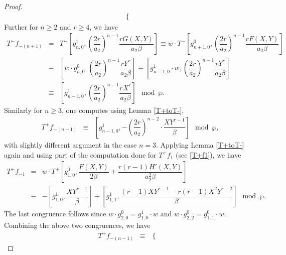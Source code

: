 \documentclass[11pt, reqno]{amsart}
\numberwithin{equation}{section}
\theoremstyle{definition}
\theoremstyle{remark}
\theoremstyle{definition}
\theoremstyle{remark}
\theoremstyle{remark}
\begin{document}
\begin{proof}
\begin{eqnarray}
\begin{cases}
\end{cases}
\end{eqnarray} 
Further for $n\geq 2$ and $r\geq 4$, we have
\begin{eqnarray*}\label{congT^-}
    T^-f_{-(n+1)}& =& T^-\left[g_{n,0}^{1}, \left(\dfrac{2r}{a_2}\right)^{n-1}\dfrac{rG(X,Y)}{a_{2}\beta}\right]
    \equiv w\cdot T^-\left[g_{n+1,0}^{0}, \left(\dfrac{2r}{a_2}\right)^{n-1}\dfrac{rF(X,Y)}{a_{2}\beta}\right]\nonumber\\
    &\equiv&  \left[w \cdot g_{n,0}^{0}, \left(\dfrac{2r}{a_2}\right)^{n-1}\dfrac{rY^{r}}{a_{2}\beta}\right]
    \equiv \left[g_{n-1,0}^{1} \cdot w, \left(\dfrac{2r}{a_2}\right)^{n-1}\dfrac{rY^{r}}{a_{2}\beta}\right]\nonumber\\
      &\equiv&  \left[g_{n-1,0}^{1}, \left(\dfrac{2r}{a_2}\right)^{n-1}\dfrac{rX^{r}}{a_{2}\beta}\right]\mod\wp.
\end{eqnarray*}
Similarly for $n\geq 3$, one computes using Lemma \ref{T+toT-},
\begin{eqnarray}\label{congT^+}
     T^+f_{-(n-1)} &\equiv &\left[g_{n-1,0}^1, -\left(\dfrac{2r}{a_2}\right)^{n-2}\cdot\dfrac{XY^{r-1}}{\beta}\right]\mod\wp,
\end{eqnarray}
with slightly different argument in the case $n=3$. Applying Lemma \ref{T+toT-} again and using part of the computation done for $T^+f_1$ (see \eqref{T+f1}), we have
\begin{eqnarray*}\label{T+f-1}
    T^{+}f_{-1} %
   &=& w\cdot T^{+}\left[g_{1,0}^0,  \dfrac{F(X,Y)}{2\beta} + \dfrac{r(r-1)H'(X,Y)}{a_{2}^2\beta}\right] \nonumber\\
&\equiv & -\left[g_{1,0}^1, \dfrac{XY^{r-1}}{\beta}\right] 
+ \left[g_{1,1}^1, \dfrac{(r-1)XY^{r-1}-r(r-1)X^2Y^{r-2}}{\beta}\right]\mod \wp.
\end{eqnarray*}
The last congruence follows since $w\cdot g_{2,0}^{0}=g_{1,0}^{1}\cdot w \text{ and } w\cdot g_{2,2}^{0} = g_{1,1}^{0}\cdot w$. Combining the above two congruences, we have 
\begin{eqnarray}
    T^{+}f_{-(n-1)} & \equiv & \begin{cases}

\end{cases}
\end{eqnarray}
\end{proof}
\end{document}
